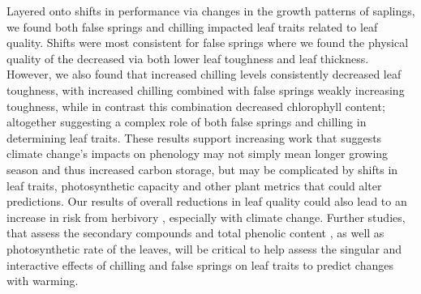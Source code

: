 \documentclass{article}\usepackage[]{graphicx}\usepackage[]{color}
\begin{document}
Layered onto shifts in performance via changes in the growth patterns of saplings, we found both false springs and chilling impacted leaf traits related to leaf quality. Shifts were most consistent for false springs where we found the physical quality of the decreased via both lower leaf toughness and leaf thickness. However, we also found that increased chilling levels consistently decreased leaf toughness, with increased chilling combined with false springs weakly increasing toughness, while in contrast this combination decreased chlorophyll content; altogether suggesting a complex role of both false springs and chilling in determining leaf traits. These results support increasing work that suggests climate change's impacts on phenology may not simply mean longer growing season and thus increased carbon storage, but may be complicated by shifts in leaf traits, photosynthetic capacity and other plant metrics \citep{Bauerle2012,Huang2020,Stinziano2017,Zani2020} that could alter predictions. Our results of overall reductions in leaf quality could also lead to an increase in risk from herbivory \citep{Onoda2011}, especially with climate change. Further studies, that assess the secondary compounds and total phenolic content \citep{Ayres1993, Webber2016}, as well as photosynthetic rate of the leaves, will be critical to help assess the singular and interactive effects of chilling and false springs on leaf traits to predict changes with warming. 
\end{document}
